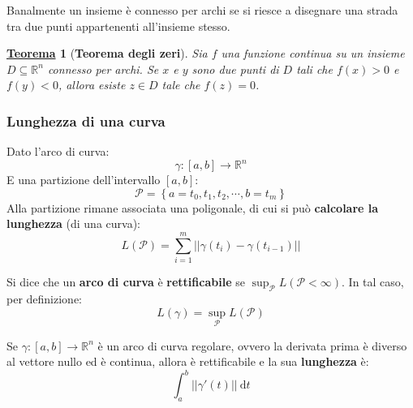\documentclass[a4paper]{article}
\newtheorem{theorem}{\textcolor{Red3}{\underline{Teorema}}}
\newcommand{\definition}[1]{\textcolor{Red3}{\textbf{#1}}}
\begin{document}
	\noindent
	Banalmente un insieme è connesso per archi se si riesce a disegnare una strada tra due punti appartenenti all'insieme stesso.

	\begin{theorem}[\textbf{Teorema degli zeri}]
		Sia $f$ una funzione continua su un insieme $D \subseteq \mathbb{R}^{n}$ connesso per archi. Se $x$ e $y$ sono due punti di $D$ tali che $f\left(x\right) > 0$ e $f\left(y\right) < 0$, allora esiste $z \in D$ tale che $f\left(z\right) = 0$.
	\end{theorem}
	
	\newpage

	\subsubsection{Lunghezza di una curva}\label{subsubsection: lunghezza di una curva}

	Dato l'arco di curva:
	\begin{equation*}
		\gamma:\left[a,b\right] \rightarrow \mathbb{R}^{n}
	\end{equation*}
	E una partizione dell'intervallo $\left[a,b\right]$:
	\begin{equation*}
		\mathcal{P} = \left\{a=t_{0}, t_{1}, t_{2}, \cdots, b = t_{m}\right\}
	\end{equation*}
	Alla partizione rimane associata una poligonale, di cui si può \textbf{calcolare la lunghezza} (di una curva):
	\begin{equation}\label{eq: lunghezza di una curva}
		L\left(\mathcal{P}\right) = \displaystyle\sum_{i=1}^{m} \left|\left| \gamma\left(t_{i}\right) - \gamma \left(t_{i-1}\right) \right|\right|
	\end{equation}

	\begin{boxdef}
		Si dice che un \definition{arco di curva} è \definition{rettificabile} se $\sup_{\mathcal{P}} L\left(\mathcal{P} < \infty\right)$. In tal caso, per definizione:
		\begin{equation*}
			L\left(\gamma\right) = \sup_{\mathcal{P}} L\left(\mathcal{P}\right)
		\end{equation*}
	\end{boxdef}

	\begin{boxdef}
		Se $\gamma : \left[a,b\right] \rightarrow \mathbb{R}^{n}$ è un arco di curva regolare, ovvero la derivata prima è diverso al vettore nullo ed è continua, allora è rettificabile e la sua \definition{lunghezza} è:
		\begin{equation}
			\displaystyle\int_{a}^{b} \left|\left| \gamma'\left(t\right) \right|\right| \: \mathrm{d}t
		\end{equation}
	\end{boxdef}
\end{document}
